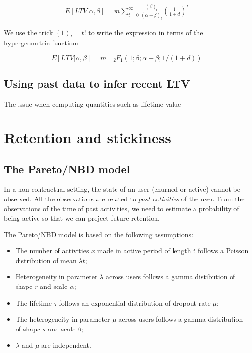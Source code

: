 \documentclass{tufte-book}
\begin{document}
\begin{align*}
  E\left[LTV|\alpha, \beta\right] = m \sum_{t=0}^{\infty} \frac{(\beta)_t}{\left(\alpha+\beta\right)_t}
  \left(\frac{1}{1+d}\right)^t
\end{align*}

We use the trick $(1)_t = t!$ to write the expression in terms of the hypergeometric function:

$$
E\left[LTV | \alpha, \beta\right] = m \quad _2F_1(1; \beta; \alpha+\beta; 1/(1+d))
$$

\subsection{Using past data to infer recent LTV}

The issue when computing quantities such as lifetime value
  
\section{Retention and stickiness}
\label{sec:retention_and_stickiness}

\subsection{The Pareto/NBD model}
\label{sub:the_pareto_nbd_model}
In a non-contractual setting, the state of an user (churned or active)
cannot be observed. All the observations are related to \emph{past
  activities} of the user. From the observations of the time of past
activities, we need to estimate a probability of being active so that
we can project future retention.

The Pareto/NBD model is based on the following assumptions:
\begin{itemize}
\item The number of activities $x$ made in active period of length
  $t$ follows a Poisson distribution of mean $\lambda t$;
\item Heterogeneity in parameter $\lambda$ across users follows a
  gamma distibution of shape $r$ and scale $\alpha$;
\item The lifetime $\tau$ follows an exponential distribution of
  dropout rate $\mu$;
\item The heterogeneity in parameter $\mu$ across users follows a
  gamma distribution of shape $s$ and scale $\beta$;
\item $\lambda$ and $\mu$ are independent.
\end{itemize}
\end{document}
